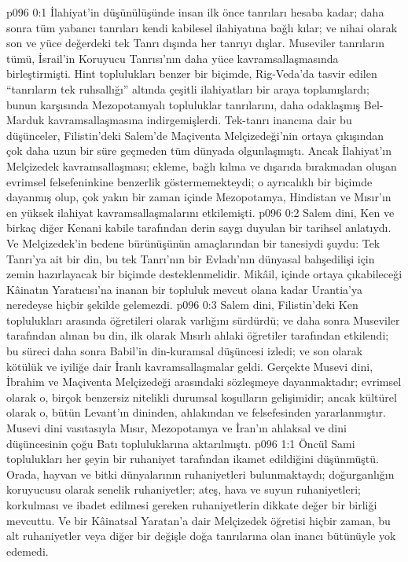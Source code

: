 \vs p096 0:1 İlahiyat’in düşünülüşünde insan ilk önce tanrıları hesaba kadar; daha sonra tüm yabancı tanrıları kendi kabilesel ilahiyatına bağlı kılar; ve nihai olarak son ve yüce değerdeki tek Tanrı dışında her tanrıyı dışlar. Museviler tanrıların tümü, İsrail’in Koruyucu Tanrısı’nın daha yüce kavramsallaşmasında birleştirmişti. Hint toplulukları benzer bir biçimde, Rig\hyp{}Veda’da tasvir edilen “tanrıların tek ruhsallığı” altında çeşitli ilahiyatları bir araya toplamışlardı; bunun karşısında Mezopotamyalı topluluklar tanrılarını, daha odaklaşmış Bel\hyp{}Marduk kavramsallaşmasına indirgemişlerdi. Tek\hyp{}tanrı inancına dair bu düşünceler, Filistin’deki Salem’de Maçiventa Melçizedeği’nin ortaya çıkışından çok daha uzun bir süre geçmeden tüm dünyada olgunlaşmıştı. Ancak İlahiyat’ın Melçizedek kavramsallaşması; ekleme, bağlı kılma ve dışarıda bırakmadan oluşan evrimsel felsefeninkine benzerlik göstermemekteydi; o ayrıcalıklı bir biçimde  dayanmış olup, çok yakın bir zaman içinde Mezopotamya, Hindistan ve Mısır’ın en yüksek ilahiyat kavramsallaşmalarını etkilemişti.
\vs p096 0:2 Salem dini, Ken ve birkaç diğer Kenani kabile tarafından derin saygı duyulan bir tarihsel anlatıydı. Ve Melçizedek’in bedene bürünüşünün amaçlarından bir tanesiydi şuydu: Tek Tanrı’ya ait bir din, bu tek Tanrı’nın bir Evladı’nın dünyasal bahşedilişi için zemin hazırlayacak bir biçimde desteklenmelidir. Mikâil, içinde ortaya çıkabileceği Kâinatın Yaratıcısı’na inanan bir topluluk mevcut olana kadar Urantia’ya neredeyse hiçbir şekilde gelemezdi.
\vs p096 0:3 Salem dini, Filistin’deki Ken toplulukları arasında öğretileri olarak varlığını sürdürdü; ve daha sonra Museviler tarafından alınan bu din, ilk olarak Mısırlı ahlaki öğretiler tarafından etkilendi; bu süreci daha sonra Babil’in din\hyp{}kuramsal düşüncesi izledi; ve son olarak kötülük ve iyiliğe dair İranlı kavramsallaşmalar geldi. Gerçekte Musevi dini, İbrahim ve Maçiventa Melçizedeği arasındaki sözleşmeye dayanmaktadır; evrimsel olarak o, birçok benzersiz nitelikli durumsal koşulların gelişimidir; ancak kültürel olarak o, bütün Levant’ın dininden, ahlakından ve felsefesinden yararlanmıştır. Musevi dini vasıtasıyla Mısır, Mezopotamya ve İran’ın ahlaksal ve dini düşüncesinin çoğu Batı topluluklarına aktarılmıştı.
\vs p096 1:1 Öncül Sami toplulukları her şeyin bir ruhaniyet tarafından ikamet edildiğini düşünmüştü. Orada, hayvan ve bitki dünyalarının ruhaniyetleri bulunmaktaydı; doğurganlığın koruyucusu olarak senelik ruhaniyetler; ateş, hava ve suyun ruhaniyetleri; korkulması ve ibadet edilmesi gereken ruhaniyetlerin dikkate değer bir birliği mevcuttu. Ve bir Kâinatsal Yaratan’a dair Melçizedek öğretisi hiçbir zaman, bu alt ruhaniyetler veya diğer bir değişle doğa tanrılarına olan inancı bütünüyle yok edemedi.
